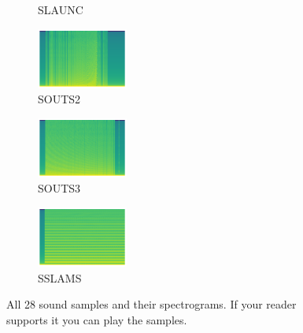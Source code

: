\begin{figure}[H]
{\begin{subfigure}{0.245\textwidth}
{{        }\hspace*{0.75cm}%
      }%
      \caption*{SLAUNC}
    \end{subfigure}
    \begin{subfigure}{0.245\textwidth}
      \includegraphics[width=3cm]{tempest_sounds/buttons/SOUTS2.raw-button.png}%
      \caption*{SOUTS2}
    \end{subfigure}
    \begin{subfigure}{0.245\textwidth}
      \includegraphics[width=3cm]{tempest_sounds/buttons/SOUTS3.raw-button.png}%
      \caption*{SOUTS3}
    \end{subfigure}
    \begin{subfigure}{0.245\textwidth}
      \includegraphics[width=3cm]{tempest_sounds/buttons/SSLAMS.raw-button.png}%
      \caption*{SSLAMS}
    \end{subfigure}
}\caption*{All 28 sound samples and their spectrograms. If your reader supports it you can play the samples.}
\end{figure}

